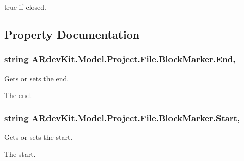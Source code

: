 true if closed. 



\subsection{Property Documentation}
\hypertarget{class_a_rdev_kit_1_1_model_1_1_project_1_1_file_1_1_block_marker_a3672477b3c409c07c7189a57fbd004c4}{
\subsubsection[{End}]{\setlength{\rightskip}{0pt plus 5cm}string A\-Rdev\-Kit.\-Model.\-Project.\-File.\-Block\-Marker.\-End\hspace{0.3cm}{\ttfamily [get]}, {\ttfamily [set]}}}\label{class_a_rdev_kit_1_1_model_1_1_project_1_1_file_1_1_block_marker_a3672477b3c409c07c7189a57fbd004c4}


Gets or sets the end. 

The end. \hypertarget{class_a_rdev_kit_1_1_model_1_1_project_1_1_file_1_1_block_marker_a7764ae600714a07a74b8ddf55f1a59d5}{
\subsubsection[{Start}]{\setlength{\rightskip}{0pt plus 5cm}string A\-Rdev\-Kit.\-Model.\-Project.\-File.\-Block\-Marker.\-Start\hspace{0.3cm}{\ttfamily [get]}, {\ttfamily [set]}}}\label{class_a_rdev_kit_1_1_model_1_1_project_1_1_file_1_1_block_marker_a7764ae600714a07a74b8ddf55f1a59d5}


Gets or sets the start. 

The start. 